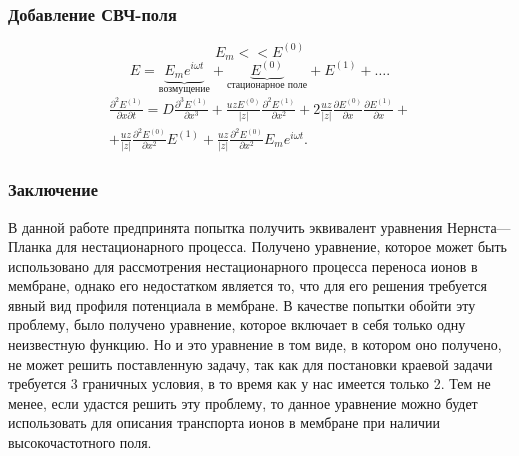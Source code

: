 \documentclass[10pt,pdf]{beamer}
\newcommand{\pder}[2] {\frac{\partial #1}{\partial #2}}
\newcommand{\ppder}[2]{\frac{\partial^2 #1}{\partial {#2}^2}}
\newcommand{\pcder}[3]{\frac{\partial^2 #1}{\partial #2 \partial #3}}
\newcommand{\abs}[1]{\left| #1 \right|}
\begin{document}
  \begin{frame}
    \frametitle{Добавление СВЧ-поля}
    \[
        E_m << E^{(0)}
    \]
    \begin{equation}
        E = \underbrace{E_m e^{i\omega t}}_\text{возмущение} +
        \underbrace{E^{(0)}}_\text{стационарное поле} +
        E^{(1)} + \ldots.
    \end{equation}
    \begin{gather}
    \pcder{E^{(1)}}{x}{t} = D\frac{\partial^3 E^{(1)}}{\partial x^3} +
    \frac{uzE^{(0)}}{\abs{z}}\ppder{E^{(1)}}{x} +
    2\frac{uz}{\abs{z}}\pder{E^{(0)}}{x}\pder{E^{(1)}}{x} +\nonumber \\+
    \frac{uz}{\abs{z}}\ppder{E^{(0)}}{x} E^{(1)} +
    \frac{uz}{\abs{z}}\ppder{E^{(0)}}{x} E_m e^{i\omega t}.
\end{gather}
  \end{frame}
  \begin{frame}
      \frametitle{Заключение}
      В данной работе предпринята попытка получить эквивалент уравнения
Нернста—Планка для нестационарного процесса. Получено уравнение, которое может быть использовано для рассмотрения нестационарного
процесса переноса ионов в мембране, однако его недостатком является то,
что для его решения требуется явный вид профиля потенциала в мембране. В
качестве попытки обойти эту проблему, было получено уравнение,
которое включает в себя только одну неизвестную функцию. Но и это
уравнение в том виде, в котором оно получено, не может решить
поставленную задачу, так как для постановки краевой задачи требуется 3
граничных условия, в то время как у нас имеется только 2. Тем не менее,
если удастся решить эту проблему, то данное уравнение можно будет
использовать для описания транспорта ионов в мембране при наличии
высокочастотного поля.
  \end{frame}
\end{document}

